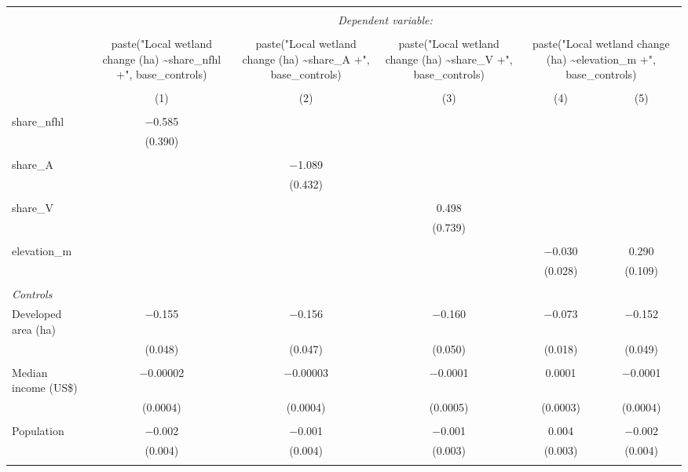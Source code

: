 \begin{tabular}{@{\extracolsep{5pt}}lccccc} 
\\[-1.8ex]\hline 
\hline \\[-1.8ex] 
 & \multicolumn{5}{c}{\textit{Dependent variable:}} \\ 
\cline{2-6} 
\\[-1.8ex] & paste("Local wetland change (ha) \textasciitilde share\_nfhl +", base\_controls) & paste("Local wetland change (ha) \textasciitilde share\_A +", base\_controls) & paste("Local wetland change (ha) \textasciitilde share\_V +", base\_controls) & \multicolumn{2}{c}{paste("Local wetland change (ha) \textasciitilde elevation\_m +", base\_controls)} \\ 
\\[-1.8ex] & (1) & (2) & (3) & (4) & (5)\\ 
\hline \\[-1.8ex] 
 share\_nfhl & $-$0.585 &  &  &  &  \\ 
  & (0.390) &  &  &  &  \\ 
  & & & & & \\ 
 share\_A &  & $-$1.089 &  &  &  \\ 
  &  & (0.432) &  &  &  \\ 
  & & & & & \\ 
 share\_V &  &  & 0.498 &  &  \\ 
  &  &  & (0.739) &  &  \\ 
  & & & & & \\ 
 elevation\_m &  &  &  & $-$0.030 & 0.290 \\ 
  &  &  &  & (0.028) & (0.109) \\ 
  & & & & & \\ 
 \emph{Controls} \\ Developed area (ha) & $-$0.155 & $-$0.156 & $-$0.160 & $-$0.073 & $-$0.152 \\ 
  & (0.048) & (0.047) & (0.050) & (0.018) & (0.049) \\ 
  & & & & & \\ 
 Median income (US\$) & $-$0.00002 & $-$0.00003 & $-$0.0001 & 0.0001 & $-$0.0001 \\ 
  & (0.0004) & (0.0004) & (0.0005) & (0.0003) & (0.0004) \\ 
  & & & & & \\ 
 Population & $-$0.002 & $-$0.001 & $-$0.001 & 0.004 & $-$0.002 \\ 
  & (0.004) & (0.004) & (0.003) & (0.003) & (0.004) \\ 
  & & & & & \\ 

\end{tabular}
